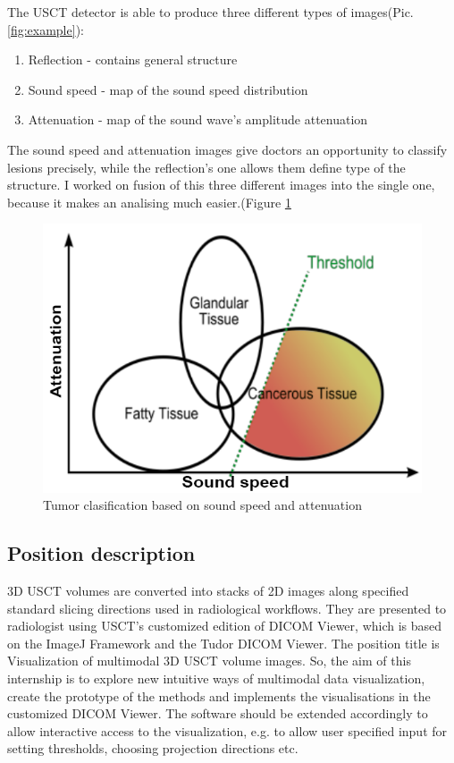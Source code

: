 \documentclass[english]{article}
\begin{document}
The USCT detector is able to produce three different types of images(Pic. \ref{fig:example}):

\begin{enumerate}
\item Reflection - contains general structure
\item Sound speed - map of the sound speed distribution
\item Attenuation - map of the sound wave's amplitude attenuation
\end{enumerate}

The sound speed and attenuation images give doctors an opportunity to classify lesions precisely, while the reflection's one allows them define type of the structure. I worked on fusion of this three different images into the single one, because it makes an analising much easier.(Figure \ref{fig:nicol}

\begin{figure}[H]
\centerline{\includegraphics[scale=0.5]{internship_report/nicol}}
\caption{Tumor clasification based on sound speed and attenuation\label{fig:nicol} \cite{nicol}}
\end{figure}
\subsection{Position description}

3D USCT volumes are converted into stacks of 2D images along specified standard slicing directions used in radiological workflows. They are presented to radiologist using USCT's customized edition of DICOM Viewer, which is based on the ImageJ Framework and the Tudor DICOM Viewer. The position title is Visualization of multimodal 3D USCT volume images. So, the aim of this internship is to explore new intuitive ways of multimodal data visualization, create the prototype of the methods and implements the visualisations in the customized DICOM Viewer. The software should be extended accordingly to allow interactive access to the visualization, e.g. to allow user specified input for setting thresholds, choosing projection directions etc.\cite{p}\\
\end{document}
